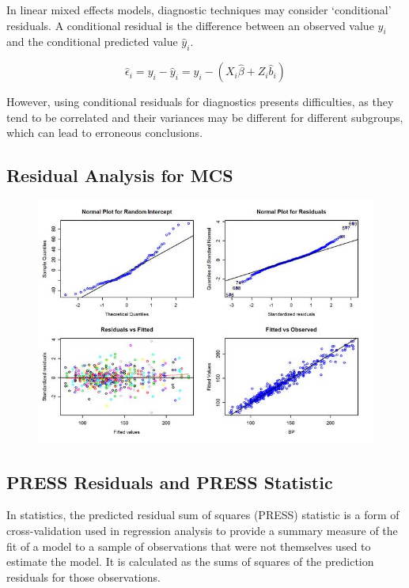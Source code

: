 \documentclass[Main.tex]{subfiles}
\begin{document}




In linear mixed effects models, diagnostic techniques may consider `conditional' residuals. A conditional residual is the difference between an observed value $y_{i}$ and the conditional predicted value $\hat{y}_{i} $.

\[ \hat{\epsilon}_{i} = y_{i} - \hat{y}_{i} = y_{i} - ( X_{i}\hat{\beta} + Z_{i}\hat{b}_{i}) \]

However, using conditional residuals for diagnostics presents difficulties, as they tend to be correlated and their variances may be different for different subgroups, which can lead to erroneous conclusions.


\newpage
\subsection{Residual Analysis for MCS}

\begin{figure}[h!]
	\centering
	\includegraphics[width=0.9\linewidth]{images/ResidPlot}
	\caption{}
	\label{fig:ResidPlot}
\end{figure}


\subsection{PRESS Residuals and PRESS Statistic}
In statistics, the predicted residual sum of squares (PRESS) statistic is a form of cross-validation used in regression analysis to provide a summary measure of the fit of a model to a sample of observations that were not themselves used to estimate the model. It is calculated as the sums of squares of the prediction residuals for those observations.
\end{document}
